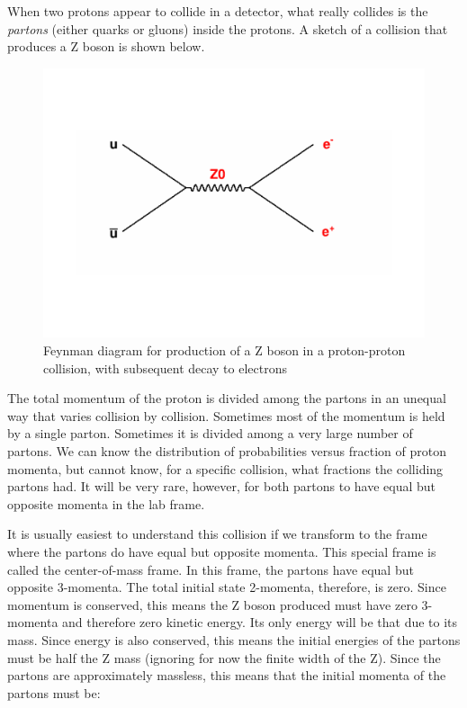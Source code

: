 When two protons appear to collide in a detector, what really collides is the {\it partons} (either quarks or gluons) inside the protons.  A sketch of a collision that produces a Z boson is shown below.
 

\begin{figure}[h]
\centering\includegraphics[scale=0.4]{./relativity/Pictures/FeynmannDiagram.pdf}
\caption{Feynman diagram for production of a Z boson in a proton-proton collision, with subsequent decay to electrons}
\label{fig:collrel}
\end{figure}




The total momentum of the proton is divided among the partons in an unequal way that varies collision by collision.  Sometimes most of the momentum is held by a single parton.  Sometimes it is divided among a very large number of partons.  We can know the distribution of probabilities versus fraction of proton momenta, but cannot know, for a specific collision, what fractions the colliding partons had.  It will be very rare, however, for both partons to have equal but opposite momenta in the lab frame.

It is usually easiest to understand this collision if we transform to the frame where the partons do have equal but opposite momenta.  This special frame is called the center-of-mass frame.  In this frame, the partons have equal but opposite 3-momenta.  The total initial state 2-momenta, therefore, is zero.  Since momentum is conserved, this means the Z boson produced must have zero 3-momenta and therefore zero kinetic energy.  Its only energy will be that due to its mass.  Since energy is also conserved, this means the initial energies of the partons must be half the Z mass (ignoring for now the finite width of the Z).  Since the partons are approximately massless, this means that the initial momenta of the partons must be:

